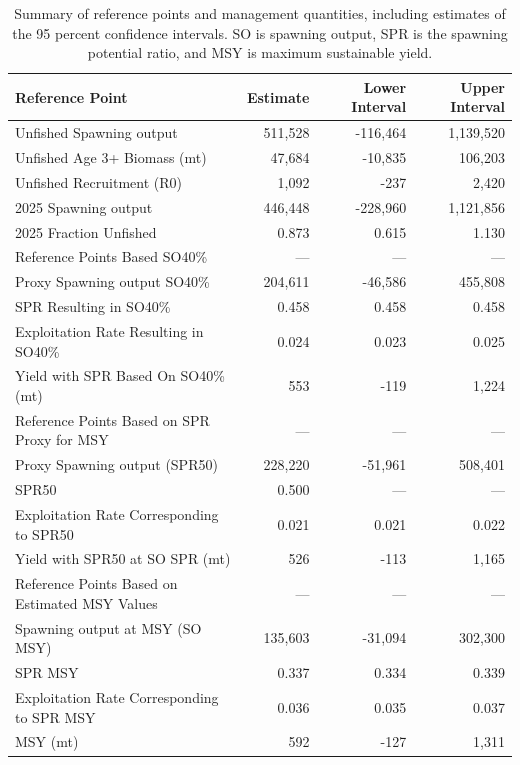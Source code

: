 \documentclass[
]{scrartcl}
\begin{document}
\begin{longtable}{lrrr}

\caption{\label{tbl-ref-points}Summary of reference points and
management quantities, including estimates of the 95 percent confidence
intervals. SO is spawning output, SPR is the spawning potential ratio,
and MSY is maximum sustainable yield.}

\tabularnewline

\toprule
Reference Point & Estimate & Lower Interval & Upper Interval \\ 
\midrule\addlinespace[2.5pt]
Unfished Spawning output & 511,528 & -116,464 & 1,139,520 \\ 
Unfished Age 3+ Biomass (mt) & 47,684 & -10,835 & 106,203 \\ 
Unfished Recruitment (R0) & 1,092 & -237 & 2,420 \\ 
2025 Spawning output & 446,448 & -228,960 & 1,121,856 \\ 
2025 Fraction Unfished & 0.873 & 0.615 & 1.130 \\ 
Reference Points Based SO40\% & — & — & — \\ 
Proxy Spawning output SO40\% & 204,611 & -46,586 & 455,808 \\ 
SPR Resulting in SO40\% & 0.458 & 0.458 & 0.458 \\ 
Exploitation Rate Resulting in SO40\% & 0.024 & 0.023 & 0.025 \\ 
Yield with SPR Based On SO40\% (mt) & 553 & -119 & 1,224 \\ 
Reference Points Based on SPR Proxy for MSY & — & — & — \\ 
Proxy Spawning output (SPR50) & 228,220 & -51,961 & 508,401 \\ 
SPR50 & 0.500 & — & — \\ 
Exploitation Rate Corresponding to SPR50 & 0.021 & 0.021 & 0.022 \\ 
Yield with SPR50 at SO SPR (mt) & 526 & -113 & 1,165 \\ 
Reference Points Based on Estimated MSY Values & — & — & — \\ 
Spawning output at MSY (SO MSY) & 135,603 & -31,094 & 302,300 \\ 
SPR MSY & 0.337 & 0.334 & 0.339 \\ 
Exploitation Rate Corresponding to SPR MSY & 0.036 & 0.035 & 0.037 \\ 
MSY (mt) & 592 & -127 & 1,311 \\ 
\bottomrule

\end{longtable}
\end{document}
